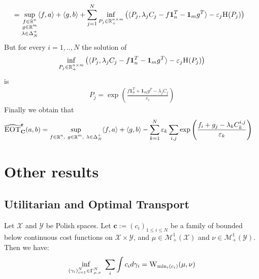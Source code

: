 \begin{prv*}
\begin{align*}
    & = \sup\limits_{\substack{f\in\mathbb{R}^n\\g\in\mathbb{R}^m\\\lambda\in\Delta_N^{+}}} \langle f,a \rangle + \langle g, b \rangle + \sum_{j=1}^N\inf_{P_j\in\mathbb{R}_+^{n\times m}}\left(\langle P_j,\lambda_jC_j-f\mathbf{1}_n^T - \mathbf{1}_m g^T\rangle -\varepsilon_j \textsc{H}(P_j) \right)
\end{align*}
But for every $i=1,..,N$ the solution of 
\begin{align*}
    \inf_{P_j\in\mathbb{R}_+^{n\times m}}\left(\langle P_j,\lambda_jC_j-f\mathbf{1}_n^T - \mathbf{1}_m g^T\rangle -\varepsilon_j \textsc{H}(P_j)\right)
\end{align*}
is
\begin{align*}
  P_j = \exp\left(\frac{f\mathbf{1}_n^T + \mathbf{1}_m g^T-\lambda_j C_j}{\varepsilon_i}\right)
\end{align*}
Finally we obtain that
\begin{align*}
    \widehat{\textsc{EOT}}^{\bm{\varepsilon}}_{\mathbf{C}}(a,b)
    &= \sup\limits_{\substack{f\in\mathbb{R}^n,~g\in\mathbb{R}^m,~\lambda\in\Delta_N^{+}}} \langle f,a \rangle + \langle g, b \rangle  - \sum_{k=1}^N \varepsilon_k \sum_{i,j} \exp\left(\frac{f_i+g_j-\lambda_k C_k^{i,j}}{\varepsilon_k}\right)
\end{align*}
\end{prv*}



\newpage 
\section{Other results}


\subsection{Utilitarian and Optimal Transport}
\label{res:min-sum}

\begin{prop}
Let $\mathcal{X}$ and $\mathcal{Y}$ be Polish spaces. Let $\mathbf{c}:=(c_i)_{1\leq i\leq N}$ be a family of bounded below continuous cost functions on $\mathcal{X}\times \mathcal{Y}$, and $\mu\in\mathcal{M}^1_+(\mathcal{X})$ and  $\nu\in\mathcal{M}^1_+(\mathcal{Y})$. Then we have:
\begin{align}
  \inf_{\substack{(\gamma_i)_{i=1}^N\in\Gamma^N_{\mu,\nu}\
}}  \sum_i \int c_i d\gamma_i = \textsc{W}_{\min_i(c_i)}(\mu,\nu)
\end{align}
\end{prop}


